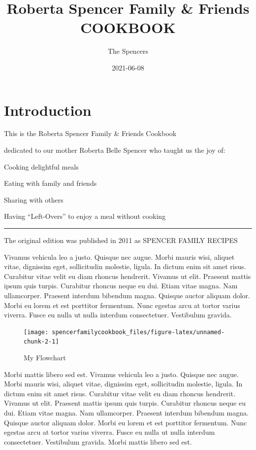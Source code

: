 \documentclass[
]{book}
\title{Roberta Spencer Family \& Friends COOKBOOK}
\author{The Spencers}
\date{2021-06-08}
\begin{document}
\maketitle

{
\setcounter{tocdepth}{1}
\tableofcontents
}
\hypertarget{introduction}{%
\chapter{Introduction}\label{introduction}}

This is the Roberta Spencer Family \& Friends Cookbook

dedicated to our mother Roberta Belle Spencer who taught us the joy of:

Cooking delightful meals

Eating with family and friends

Sharing with others

Having ``Left-Overs'' to enjoy a meal without cooking

\begin{center}\rule{0.5\linewidth}{0.5pt}\end{center}

The original edition was published in 2011 as SPENCER FAMILY RECIPES

Vivamus vehicula leo a justo. Quisque nec augue. Morbi mauris wisi, aliquet vitae, dignissim eget, sollicitudin molestie, ligula. In dictum enim sit amet risus. Curabitur vitae velit eu diam rhoncus hendrerit. Vivamus ut elit. Praesent mattis ipsum quis turpis. Curabitur rhoncus neque eu dui. Etiam vitae magna. Nam ullamcorper. Praesent interdum bibendum magna. Quisque auctor aliquam dolor. Morbi eu lorem et est porttitor fermentum. Nunc egestas arcu at tortor varius viverra. Fusce eu nulla ut nulla interdum consectetuer. Vestibulum gravida.

\begin{figure}

\hfill{}\texttt{[image: spencerfamilycookbook\_files/figure-latex/unnamed-chunk-2-1]} 

\caption{My Flowchart}\label{fig:unnamed-chunk-2}
\end{figure}

Morbi mattis libero sed est. Vivamus vehicula leo a justo. Quisque nec augue. Morbi mauris wisi, aliquet vitae, dignissim eget, sollicitudin molestie, ligula. In dictum enim sit amet risus. Curabitur vitae velit eu diam rhoncus hendrerit. Vivamus ut elit. Praesent mattis ipsum quis turpis. Curabitur rhoncus neque eu dui. Etiam vitae magna. Nam ullamcorper. Praesent interdum bibendum magna. Quisque auctor aliquam dolor. Morbi eu lorem et est porttitor fermentum. Nunc egestas arcu at tortor varius viverra. Fusce eu nulla ut nulla interdum consectetuer. Vestibulum gravida. Morbi mattis libero sed est.
\end{document}
